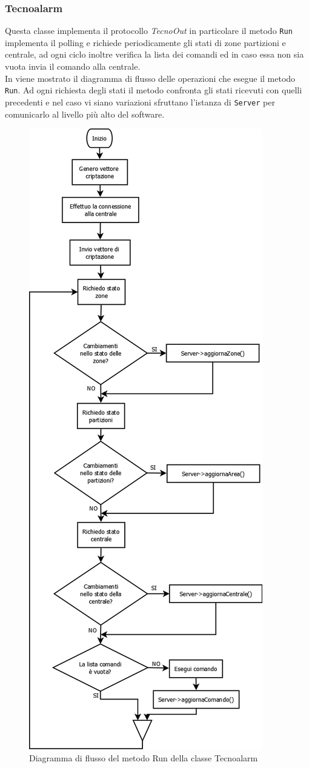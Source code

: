 \subsubsection{Tecnoalarm}
Questa classe implementa il protocollo \emph{TecnoOut} in particolare il metodo \texttt{Run} implementa il polling e richiede periodicamente gli stati di zone partizioni e centrale, ad ogni ciclo inoltre verifica la lista dei comandi ed in caso essa non sia vuota invia il comando alla centrale.\\
In  viene mostrato il diagramma di flusso delle operazioni che esegue il metodo \texttt{Run}. Ad ogni richiesta degli stati il metodo confronta gli stati ricevuti con quelli precedenti e nel caso vi siano variazioni sfruttano l'istanza di \texttt{Server} per comunicarlo al livello più alto del software.
\begin{figure}
	\centering
	\includegraphics[width=0.7\linewidth]{pictures/runtecno.png}
	\caption{Diagramma di flusso del metodo Run della classe Tecnoalarm}\label{fig:flussotecno}
\end{figure}
